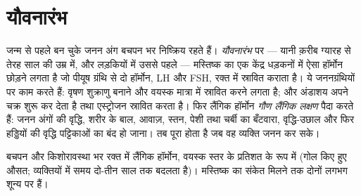 \section{यौवनारंभ}

\begin{proposition}[यौवनारंभ]\label{prop:g11:becoming-male-female:puberty}
जन्म से पहले बन चुके जनन अंग बचपन भर निष्क्रिय रहते हैं।
\emph{यौवनारंभ} पर --- यानी क़रीब ग्यारह से तेरह साल की
उम्र में, और लड़कियों में उससे पहले --- मस्तिष्क का एक केंद्र धड़कनों में
ऐसा हॉर्मोन छोड़ने लगता है जो पीयूष ग्रंथि से दो हॉर्मोन, LH और FSH, रक्त
में स्रावित कराता है। ये जननग्रंथियों पर काम करते हैं: वृषण शुक्राणु बनाने
और वयस्क मात्रा में  स्रावित करने लगता है; और अंडाशय अपने चक्र
शुरू कर देता है तथा एस्ट्रोजन स्रावित करता है। फिर लैंगिक हॉर्मोन
\emph{गौण लैंगिक लक्षण} पैदा करते हैं: जनन अंगों की वृद्धि, शरीर के बाल,
आवाज़, स्तन, पेशी तथा चर्बी का बँटवारा, वृद्धि-उछाल और फिर हड्डियों की
वृद्धि पट्टिकाओं का बंद हो जाना।  तब पूरा होता है जब वह व्यक्ति
जनन कर सके।
\end{proposition}
\admitted

\begin{omfigure}

{\small बचपन और किशोरावस्था भर रक्त में लैंगिक हॉर्मोन, वयस्क स्तर के
प्रतिशत के रूप में (गोल किए हुए औसत; व्यक्तियों में समय दो-तीन साल तक
बदलता है)। मस्तिष्क का संकेत मिलने तक दोनों लगभग शून्य पर हैं।}
\end{omfigure}

